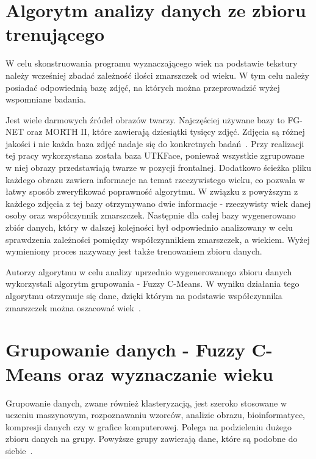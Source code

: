 \documentclass[a4paper,twoside,12pt]{book}
\begin{document}
    \section{Algorytm analizy danych ze zbioru trenującego}\label{sec:algorytmTrenowania}
    W celu skonstruowania programu wyznaczającego wiek na podstawie tekstury należy wcześniej zbadać zależność ilości
    zmarszczek od wieku.
    W tym celu należy posiadać odpowiednią bazę zdjęć, na których można przeprowadzić wyżej wspomniane badania.

    Jest wiele darmowych źródeł obrazów twarzy.
    Najczęściej używane bazy to FG-NET oraz MORTH II, które
    zawierają dziesiątki tysięcy zdjęć.
    Zdjęcia są różnej jakości i nie każda baza zdjęć nadaje się do konkretnych badań~\cite{khryashchevGanin}.
    Przy realizacji tej pracy wykorzystana została baza UTKFace,
    ponieważ wszystkie zgrupowane w niej obrazy przedstawiają twarze w pozycji frontalnej. Dodatkowo
    ścieżka pliku każdego obrazu zawiera informacje na temat rzeczywistego wieku, co pozwala w łatwy sposób
    zweryfikować poprawność algorytmu.
    W związku z powyższym z każdego zdjęcia z tej bazy otrzymywano dwie informacje - rzeczywisty wiek danej osoby oraz
    współczynnik zmarszczek.
    Następnie dla całej bazy wygenerowano zbiór danych, który w dalszej kolejności był odpowiednio analizowany w celu
    sprawdzenia zależności pomiędzy współczynnikiem zmarszczek, a wiekiem. Wyżej wymieniony proces nazywany jest
    także trenowaniem zbioru danych.

    Autorzy algorytmu w celu analizy uprzednio wygenerowanego zbioru danych wykorzystali algorytm grupowania -
    Fuzzy C-Means.
    W wyniku działania tego algorytmu otrzymuje się dane, dzięki którym na podstawie współczynnika zmarszczek można
    oszacować wiek~\cite{wrinkleFeatures}.
    \section{Grupowanie danych - Fuzzy C-Means oraz wyznaczanie wieku}\label{sec:grupowanieDanych}
    Grupowanie danych, zwane również klasteryzacją, jest szeroko stosowane w uczeniu maszynowym, rozpoznawaniu wzorców,
    analizie obrazu, bioinformatyce, kompresji danych czy w grafice komputerowej.
    Polega na podzieleniu dużego zbioru danych na grupy.
    Powyższe grupy zawierają dane, które są podobne do siebie~\cite{clusterWstep}.
\end{document}
